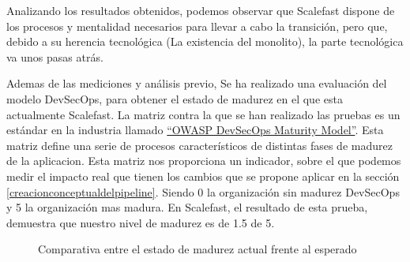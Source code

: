 \documentclass[12pt]{report} %
\begin{document}
Analizando los resultados obtenidos, podemos observar que Scalefast dispone de
los procesos y mentalidad necesarios para llevar a cabo la transición, pero que,
debido a su herencia tecnológica (La existencia del monolito), la parte
tecnológica va unos pasas atrás.

Ademas de las mediciones y análisis previo, 
Se ha realizado una evaluación del modelo \gls{DevSecOps}, para obtener el
estado de madurez en el que esta actualmente Scalefast.
La matriz contra la que se han realizado las pruebas es un estándar en la
industria llamado \href{https://dsomm.timo-pagel.de/index.FP}{``OWASP DevSecOps Maturity Model''}.
Esta matriz define una serie de procesos característicos de distintas fases de
madurez de la aplicacion.
Esta matriz nos proporciona un indicador, sobre el que podemos medir el impacto
real que tienen los cambios que se propone aplicar en la sección
\ref{creacionconceptualdelpipeline}.
Siendo 0 la organización sin madurez \gls{DevSecOps} y 5 la organización mas madura.
En Scalefast, el resultado de esta prueba, demuestra que nuestro nivel de
madurez es de 1.5 de 5.


\begin{figure}[H]
  \centering
  \qquad
  \caption{Comparativa entre el estado de madurez actual frente al esperado}%
  \label{fig:DSOMM-comparison}
\end{figure}
\end{document}
